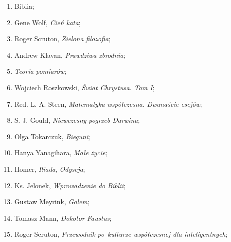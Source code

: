 \documentclass[a4paper,11pt]{article}
\begin{document}
\begin{enumerate}

\item Biblia;



\item Gene Wolf, \textit{Cień kata};



\item Roger Scruton, \textit{Zielona filozofia};



\item Andrew Klavan, \textit{Prawdziwa zbrodnia};



\item \textit{Teoria pomiarów};



\item Wojciech Roszkowski, \textit{Świat Chrystusa. Tom I};



\item Red. L. A. Steen, \textit{Matematyka współczesna. Dwanaście
    esejów};



\item S. J. Gould, \textit{Niewczesny pogrzeb Darwina};



\item Olga Tokarczuk, \textit{Bieguni};



\item Hanya Yanagihara, \textit{Małe życie};



\item Homer, \textit{Iliada}, \textit{Odyseja};



\item Ks. Jelonek, \textit{Wprowadzenie do Biblii};



\item Gustaw Meyrink, \textit{Golem};



\item Tomasz Mann, \textit{Dokotor Faustus};



\item Roger Scruton, \textit{Przewodnik po~kulturze współczesnej dla
    inteligentnych};




\end{enumerate}
\end{document}
